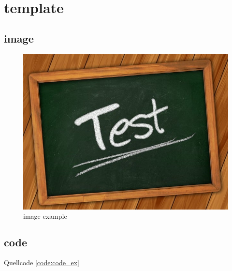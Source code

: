 \chapter{template}
\section{image}

\begin{figure}[H]
	\centering
	\includegraphics[width=0.8\linewidth]{figures/test.jpg}
	\caption{image example}
\end{figure}

\section{code}
Quellcode \ref{code:code_ex} 

